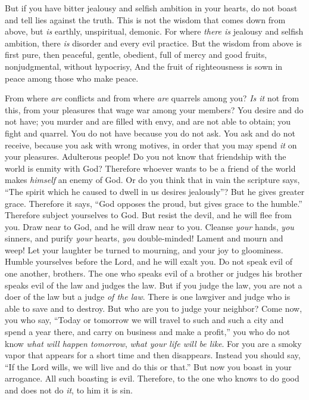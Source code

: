 \begin{biblechapter}
\verse But if you have bitter jealousy and selfish ambition in your hearts, do not boast and tell lies against the truth.
\verse This is not the wisdom that comes down from above, but \textit{is} earthly, unspiritual, demonic.
\verse For where \textit{there is} jealousy and selfish ambition, there \textit{is} disorder and every evil practice.
\verse But the wisdom from above is first pure, then peaceful, gentle, obedient, full of mercy and good fruits, nonjudgmental, without hypocrisy,
\verse And the fruit of righteousness is sown in peace among those who make peace.
\end{biblechapter}

\begin{biblechapter} %
 From where \textit{are} conflicts and from where \textit{are} quarrels among you? \textit{Is it} not from this, from your pleasures that wage war among your members?
\verse You desire and do not have; you murder and are filled with envy, and are not able to obtain; you fight and quarrel. You do not have because you do not ask.
\verse You ask and do not receive, because you ask with wrong motives, in order that you may spend \textit{it} on your pleasures.
\verse Adulterous people! Do you not know that friendship with the world is enmity with God? Therefore whoever wants to be a friend of the world makes \textit{himself} an enemy of God.
\verse Or do you think that in vain the scripture says, “The spirit which he caused to dwell in us desires jealously”?
\verse But he gives greater grace. Therefore it says, “God opposes the proud, 
but gives grace to the humble.”
\verse Therefore subject yourselves to God. But resist the devil, and he will flee from you.
\verse Draw near to God, and he will draw near to you. Cleanse \textit{your} hands, \textit{you} sinners, and purify \textit{your} hearts, \textit{you} double-minded!
\verse Lament and mourn and weep! Let your laughter be turned to mourning, and your joy to gloominess.
\verse Humble yourselves before the Lord, and he will exalt you.
\verse Do not speak evil of one another, brothers. The one who speaks evil of a brother or judges his brother speaks evil of the law and judges the law. But if you judge the law, you are not a doer of the law but a judge \textit{of the law}.
\verse There is one lawgiver and judge who is able to save and to destroy. But who are you to judge your neighbor?
 Come now, you who say, “Today or tomorrow we will travel to such and such a city and spend a year there, and carry on business and make a profit,”
\verse you who do not know \textit{what will happen tomorrow}, \textit{what your life will be like}. For you are a smoky vapor that appears for a short time and then disappears.
\verse Instead you should say, “If the Lord wills, we will live and do this or that.”
\verse But now you boast in your arrogance. All such boasting is evil.
\verse Therefore, to the one who knows to do good and does not do \textit{it}, to him it is sin.
\end{biblechapter}


